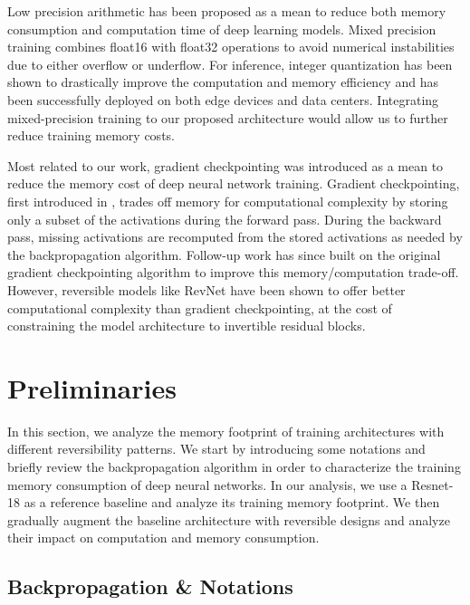 \documentclass[twocolumn]{bmcart}
\begin{document}
Low precision arithmetic has been proposed as a mean to reduce both memory consumption and computation time of deep learning models. Mixed precision training \cite{micikevicius2017mixed} combines float16 with float32 operations to avoid numerical instabilities due to either overflow or underflow.
For inference, integer quantization \cite{jacob2018quantization,wu2018training} has been shown to drastically improve the computation and memory efficiency and has been successfully deployed on both edge devices and data centers.
Integrating mixed-precision training to our proposed architecture would allow us to further reduce training memory costs. 

Most related to our work, gradient checkpointing was introduced as a mean to reduce the memory cost of deep neural network training.
Gradient checkpointing, first introduced in \cite{martens2012training}, trades off memory for computational complexity by storing only a subset of the activations during the forward pass.
During the backward pass, missing activations are recomputed from the stored activations as needed by the backpropagation algorithm.
Follow-up work \cite{chen2016training} has since built on the original gradient checkpointing algorithm to improve this memory/computation trade-off.  
However, reversible models like RevNet have been shown to offer better computational complexity than gradient checkpointing,
at the cost of constraining the model architecture to invertible residual blocks.

\section{Preliminaries}

In this section, we analyze the memory footprint of training architectures with different reversibility patterns.
We start by introducing some notations and briefly review the backpropagation algorithm
in order to characterize the training memory consumption of deep neural networks. 
In our analysis, we use a Resnet-18 as a reference baseline and analyze its training memory footprint.
We then gradually augment the baseline architecture with reversible designs and analyze their impact on computation and memory consumption.

\subsection{Backpropagation \& Notations}
\end{document}
